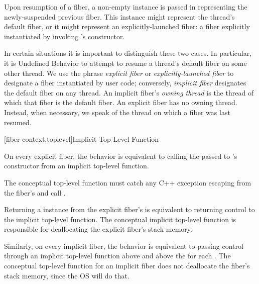 Upon resumption of a fiber, a non-empty \fiber instance is passed in
representing the newly-suspended previous fiber. This \fiber instance might
represent the thread's default fiber, or it might represent an
explicitly-launched fiber: a fiber explicitly instantiated by
invoking \fiber's constructor.

In certain situations it is important to distinguish these two cases. In
particular, it is Undefined Behavior to attempt to resume a thread's default
fiber on some other thread. We use the phrase \emph{explicit fiber}
or \emph{explicitly-launched fiber} to designate a fiber instantiated by user
code; conversely, \emph{implicit fiber} designates the default fiber on any
thread. An implicit fiber's \emph{owning thread} is the thread of which that
fiber is the default fiber. An explicit fiber has no owning thread. Instead,
when necessary, we speak of the thread on which a fiber was last resumed.

[fiber-context.toplevel]{Implicit Top-Level Function}

On every explicit fiber, the behavior is equivalent to calling the \entryfn
passed to \fiber's constructor from an implicit top-level function.

The conceptual top-level function must catch any C++ exception escaping from the
fiber's \entryfn and call .

Returning a \fiber instance from the explicit fiber's \entryfn is equivalent
to returning control to the implicit top-level function.
The
conceptual implicit top-level function is responsible for deallocating the
explicit fiber's stack memory.

Similarly, on every implicit fiber, the behavior is equivalent to passing control through an
implicit top-level function above \main and above the \entryfn for
each \thread.
The conceptual top-level
function for an implicit fiber does not deallocate the fiber's stack memory,
since the OS will do that.

